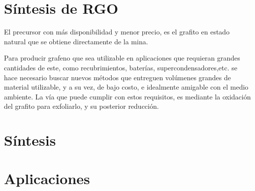 \section{Síntesis de RGO}
El precursor con más disponibilidad y menor precio, es el grafito en estado natural que se obtiene directamente de la mina.

Para producir grafeno que sea utilizable en aplicaciones que requieran grandes cantidades de este, como recubrimientos, baterías, supercondensadores,etc. se hace necesario buscar nuevos métodos que entreguen volúmenes grandes de material utilizable, y a su vez, de bajo costo, e idealmente amigable con el medio ambiente. La vía que puede cumplir con estos requisitos, es mediante la oxidación del grafito para exfoliarlo, y su posterior reducción.

\section{Síntesis}


\section{Aplicaciones}